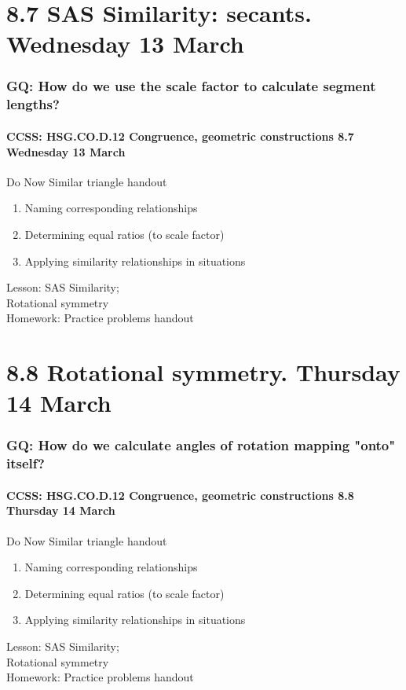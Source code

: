 \documentclass{beamer}
\begin{document}
\section{8.7 SAS Similarity: secants. Wednesday 13 March}
  \frame
  {
    \frametitle{GQ: How do we use the scale factor to calculate segment lengths?}
    \framesubtitle{CCSS: HSG.CO.D.12 Congruence, geometric constructions \hfill \alert{8.7 Wednesday 13 March}}

    \begin{block}{Do Now Similar triangle handout}
      \begin{enumerate}
        \item Naming corresponding relationships
        \item Determining equal ratios (to scale factor)
        \item Applying similarity relationships in situations
      \end{enumerate}
    \end{block}
    Lesson: SAS Similarity;
    \\Rotational symmetry\\[0.5cm]
    Homework: Practice problems handout
  }

\section{8.8 Rotational symmetry. Thursday 14 March}
  \frame
  {
    \frametitle{GQ: How do we calculate angles of rotation mapping "onto" itself?}
    \framesubtitle{CCSS: HSG.CO.D.12 Congruence, geometric constructions \hfill \alert{8.8 Thursday 14 March}}

    \begin{block}{Do Now Similar triangle handout}
      \begin{enumerate}
        \item Naming corresponding relationships
        \item Determining equal ratios (to scale factor)
        \item Applying similarity relationships in situations
      \end{enumerate}
    \end{block}
    Lesson: SAS Similarity;
    \\Rotational symmetry\\[0.5cm]
    Homework: Practice problems handout
  }
\end{document}
